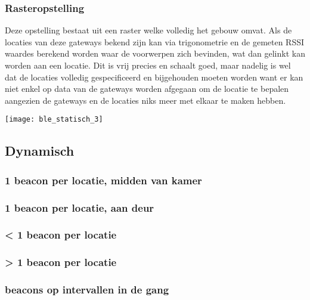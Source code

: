 \subsubsection{Rasteropstelling}
\begin{minipage}{0.65\textwidth}
Deze opstelling bestaat uit een raster welke volledig het gebouw omvat. Als de locaties van deze gateways bekend zijn kan via trigonometrie en de gemeten RSSI waardes berekend worden waar de voorwerpen zich bevinden, wat dan gelinkt kan worden aan een locatie. Dit is vrij precies en schaalt goed, maar nadelig is wel dat de locaties volledig gespecificeerd en bijgehouden moeten worden want er kan niet enkel op data van de gateways worden afgegaan om de locatie te bepalen aangezien de gateways en de locaties niks meer met elkaar te maken hebben.
\end{minipage}
\hfill
\begin{minipage}{0.30\textwidth}
	\texttt{[image: ble\_statisch\_3]}
\end{minipage}


\subsection{Dynamisch}

\subsubsection{1 beacon per locatie, midden van kamer}

\subsubsection{1 beacon per locatie, aan deur}

\subsubsection{< 1 beacon per locatie}

\subsubsection{> 1 beacon per locatie}

\subsubsection{beacons op intervallen in de gang}
